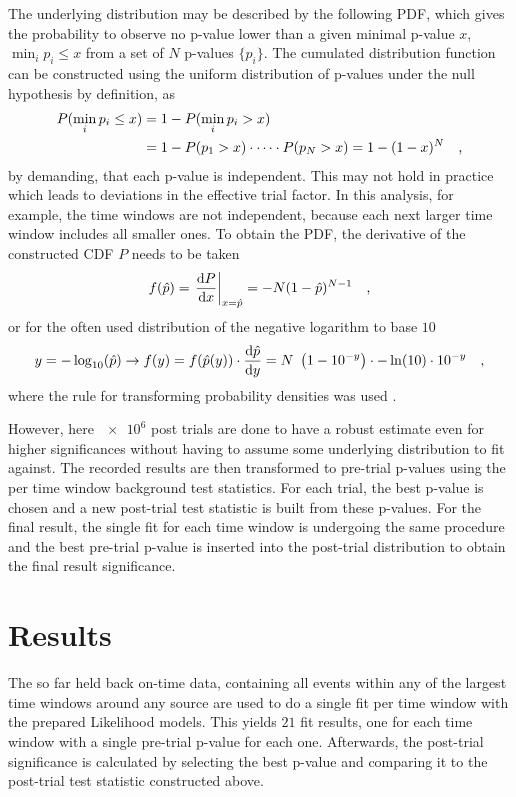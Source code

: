 The underlying distribution may be described by the following PDF, which gives the probability to observe no p-value lower than a given minimal p-value $x$, $\min_i{p_i} \leq x$ from a set of $N$ p-values $\{p_i\}$.
The cumulated distribution function can be constructed using the uniform distribution of p-values under the null hypothesis by definition, as
\begin{align}
  P(\min_i{p_i} \leq x)
  &= 1 - P(\min_i{p_i} > x) \\
  &= 1 - P(p_1 > x)\cdot\dots\cdot P(p_N > x)
  = 1 - (1-x)^N
  \quad\text{,}
\end{align}
by demanding, that each p-value is independent.
This may not hold in practice which leads to deviations in the effective trial factor.
In this analysis, for example, the time windows are not independent, because each next larger time window includes all smaller ones.
To obtain the PDF, the derivative of the constructed CDF $P$ needs to be taken
\begin{equation}
  f(\hat{p})
  = \left. \frac{\mathrm{d}P}{\mathrm{d}x} \right|_{x=\hat{p}}
  = -N(1 - \hat{p})^{N-1}
  \quad\text{,}
\end{equation}
or for the often used distribution of the negative logarithm to base $\num{10}$
\begin{equation}
  y = -\log_{10}(\hat{p})
  \rightarrow
  f(y) = f(\hat{p}(y))\cdot\dd{\hat{p}}{y}
  = N \left( 1 - 10^{-y} \right) \cdot -\ln(10)\cdot 10^{-y}
  \mcomma
\end{equation}
where the rule for transforming probability densities was used .

However, here $\num{e6}$ post trials are done to have a robust estimate even for higher significances without having to assume some underlying distribution to fit against.
The recorded results are then transformed to pre-trial p-values using the per time window background test statistics.
For each trial, the best p-value is chosen and a new post-trial test statistic is built from these p-values.
For the final result, the single fit for each time window is undergoing the same procedure and the best pre-trial p-value is inserted into the post-trial distribution to obtain the final result significance.

\section{Results}
The so far held back on-time data, containing all events within any of the largest time windows around any source are used to do a single fit per time window with the prepared Likelihood models.
This yields $\num{21}$ fit results, one for each time window with a single pre-trial p-value for each one.
Afterwards, the post-trial significance is calculated by selecting the best p-value and comparing it to the post-trial test statistic constructed above.

